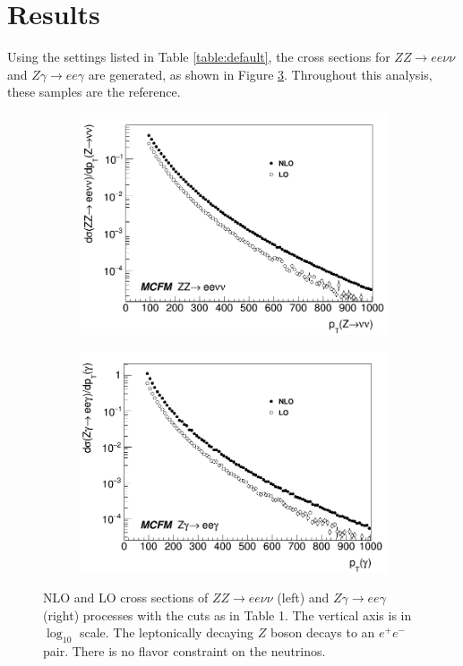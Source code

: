 \documentclass[11pt,a4paper,openright,twoside]{report}
\begin{document}
\section{Results}
Using the settings listed in Table \ref{table:default}, the cross sections for $ZZ\to ee\nu\nu$ and $Z\gamma\to ee\gamma$ are generated, as shown in Figure \ref{xsecs}. Throughout this analysis, these samples are the reference.
\begin{figure}[H]
\centering
	\begin{subfigure}{0.49\textwidth}
		\includegraphics[width=\linewidth]{ZZ_xsec.png}
		\caption{}
		\label{subfig:ZeeZvv}
	\end{subfigure}	
	\begin{subfigure}{0.49\textwidth}
		\includegraphics[width=\linewidth]{Zg_xsec.png}
		\caption{}
		\label{subfig:Zeeg}	
	\end{subfigure}
	\caption{NLO and LO cross sections of $ZZ\to ee\nu\nu$ (left) and $Z\gamma\to ee\gamma$ (right) processes with the cuts as in Table 1. The vertical axis is in $\log_{10}$ scale. The leptonically decaying $Z$ boson decays to an $e^+e^-$ pair. There is no flavor constraint on the neutrinos.}
	\label{xsecs}
\end{figure}
\end{document}
